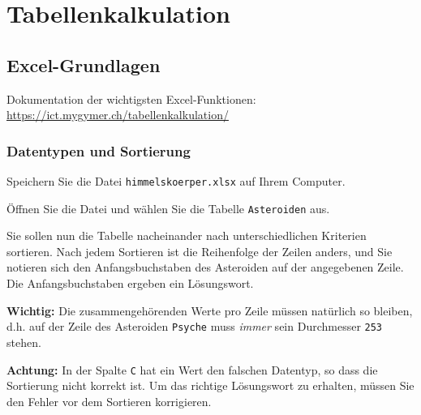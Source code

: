 \chapter{Tabellenkalkulation}\label{ch:Lektion}
\section{Excel-Grundlagen}
\begin{mycaution}
    Dokumentation der wichtigsten Excel-Funktionen: \url{https://ict.mygymer.ch/tabellenkalkulation/}
\end{mycaution}
\subsection{Datentypen und Sortierung}

\begin{mysubmission}
    Speichern Sie die Datei \texttt{himmelskoerper.xlsx} auf Ihrem Computer.

    Öffnen Sie die Datei und wählen Sie die Tabelle \texttt{Asteroiden} aus.

    Sie sollen nun die Tabelle nacheinander nach unterschiedlichen Kriterien sortieren. Nach jedem Sortieren ist die Reihenfolge der Zeilen anders, und Sie notieren sich den Anfangsbuchstaben des Asteroiden auf der angegebenen Zeile. Die Anfangsbuchstaben ergeben ein Lösungswort.

    \textbf{Wichtig:} Die zusammengehörenden Werte pro Zeile müssen natürlich so bleiben, d.h. auf der Zeile des Asteroiden \texttt{Psyche} muss \textit{immer} sein Durchmesser \texttt{253} stehen.

    \textbf{Achtung:} In der Spalte \texttt{C} hat ein Wert den falschen Datentyp, so dass die Sortierung nicht korrekt ist. Um das richtige Lösungswort zu erhalten, müssen Sie den Fehler vor dem Sortieren korrigieren.


\end{mysubmission}
